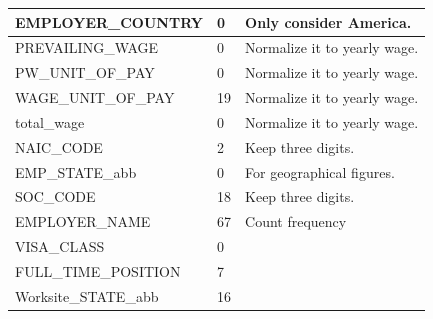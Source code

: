 \documentclass{article}
\begin{document}
\begin{table}[H]
\begin{tabular}{lll}
EMPLOYER\_COUNTRY & 0 & {\color{blue} Only consider America. }\\ \hline
PREVAILING\_WAGE & 0 & {\color{blue} Normalize it to yearly wage. }\\ \hline
PW\_UNIT\_OF\_PAY & 0 & {\color{blue} Normalize it to yearly wage. }\\ \hline
WAGE\_UNIT\_OF\_PAY & 19 & {\color{blue} Normalize it to yearly wage. }\\ \hline
total\_wage & 0 & {\color{blue} Normalize it to yearly wage. }\\ \hline
NAIC\_CODE & 2 & {\color{blue} Keep three digits. }\\ \hline
EMP\_STATE\_abb & 0 & {\color{blue} For geographical figures. }\\ \hline
SOC\_CODE & 18 & {\color{blue} Keep three digits. }\\ \hline
EMPLOYER\_NAME & 67 & {\color{blue} Count frequency }\\ \hline
VISA\_CLASS & 0 & \\ \hline
FULL\_TIME\_POSITION & 7 & \\ \hline
Worksite\_STATE\_abb & 16 & \\ \hline
\end{tabular}
\end{table}
\end{document}
